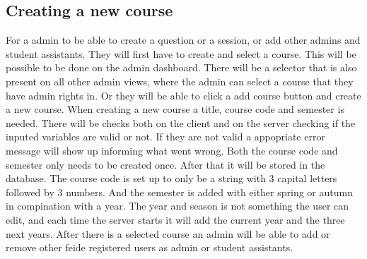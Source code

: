 \subsection{Creating a new course}
For a admin to be able to create a question or a session, or add other admins and student assistants. They will first have to create and select a course. This will be possible to be done on the admin dashboard. There will be a selector that is also present on all other admin views, where the admin can select a course that they have admin rights in. Or they will be able to click a add course button and create a new course. When creating a new course a title, course code and semester is needed. There will be checks both on the client and on the server checking if the inputed variables are valid or not. If they are not valid a appopriate error message will show up informing what went wrong. Both the course code and semester only needs to be created once. After that it will be stored in the database. The course code is set up to only be a string with 3 capital letters followed by 3 numbers. And the semester is added with either spring or autumn in compination with a year. The year and season is not something the user can edit, and each time the server starts it will add the current year and the three next years. After there is a selected course an admin will be able to add or remove other feide registered users as admin or student assistants.
